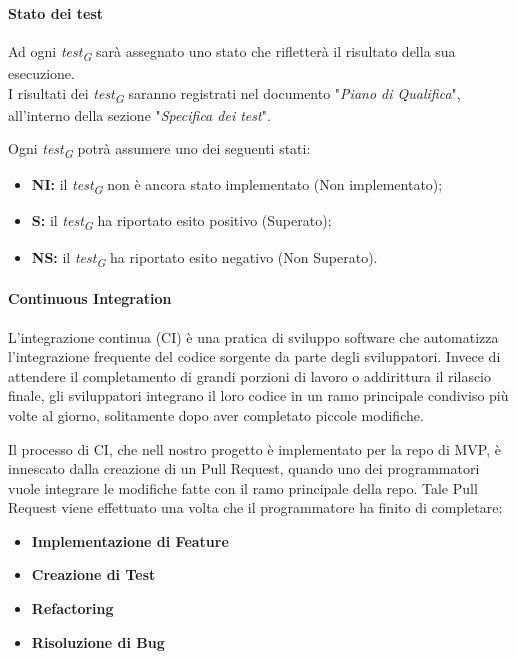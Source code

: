 \paragraph{Stato dei test}
Ad ogni \textit{test}\textsubscript{\textit{G}} sarà assegnato uno stato che rifletterà il risultato della sua esecuzione. \\
I risultati dei \textit{test}\textsubscript{\textit{G}} saranno registrati nel documento "\textit{Piano di Qualifica}", all'interno della sezione "\textit{Specifica dei test}".

\vspace{0.2cm}

Ogni \textit{test}\textsubscript{\textit{G}} potrà assumere uno dei seguenti stati:

\begin{itemize}
    \item \textbf{NI:} 
        il \textit{test}\textsubscript{\textit{G}} non è ancora stato implementato (Non implementato); 
    \item \textbf{S:} 
        il \textit{test}\textsubscript{\textit{G}} ha riportato esito positivo (Superato); 
    \item \textbf{NS:}
        il \textit{test}\textsubscript{\textit{G}} ha riportato esito negativo (Non Superato).
\end{itemize}

\paragraph{Continuous Integration}
L'integrazione continua (CI) è una pratica di sviluppo software che automatizza l'integrazione frequente del codice sorgente da parte degli sviluppatori. Invece di attendere il completamento di grandi porzioni di lavoro o addirittura il rilascio finale, gli sviluppatori integrano il loro codice in un ramo principale condiviso più volte al giorno, solitamente dopo aver completato piccole modifiche.

\vspace{0.2cm}

Il processo di CI, che nell nostro progetto è implementato per la repo di MVP, è innescato dalla creazione di un Pull Request, quando uno dei programmatori vuole integrare le modifiche fatte con il ramo principale della repo. Tale Pull Request viene effettuato una volta che il programmatore ha finito di completare:

\begin{itemize}
    \item \textbf{Implementazione di Feature}
    \item \textbf{Creazione di Test}
    \item \textbf{Refactoring}
    \item \textbf{Risoluzione di Bug}
\end{itemize}


